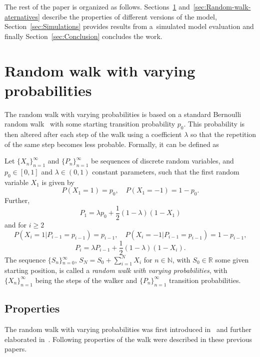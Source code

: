 The rest of the paper is organized as follows.
Sections~\ref{sec:Random-walk-with}
and~\ref{sec:Random-walk-aternatives}
describe the properties of different versions of the model,
Section~\ref{sec:Simulations} provides results from a~simulated
model evaluation and finally Section~\ref{sec:Conclusion} concludes
the work.


\section{Random walk with varying probabilities}\label{sec:Random-walk-with}

The random walk with varying probabilities is based on a standard
Bernoulli random walk~\cite{feller1957introduction} with some starting
transition probability $p_{0}$.
This probability is then altered
after each step of the walk using a coefficient $\lambda$ so that
the repetition of the same step becomes less probable.
Formally, it
can be defined as

\begin{definition}
\label{success_punished}
Let ${\{X_{n}\}}_{n=1}^{\infty}$ and ${\{P_{n}\}}_{n=1}^{\infty}$
be sequences of discrete random variables, and $p_{0}\in[0,1]$
and $\lambda\in(0,1)$ constant parameters, such that the first
random variable $X_{1}$ is given by
\[
P(X_{1}=1)=p_{0},\quad
P(X_{1}=-1)=1-p_{0}.
\]
Further,
\begin{equation}
P_{1}=\lambda p_{0}+\frac{1}{2}(1-\lambda)(1-X_{1})\label{eq:P!1_def}
\end{equation}
and for $i\geq2$
\[
P(X_{i}=1|P_{i-1}=p_{i-1})=p_{i-1},\quad
P(X_{i}=-1|P_{i-1}=p_{i-1})=1-p_{i-1},
\]
\begin{equation}
P_{i}=\lambda P_{i-1}+\frac{1}{2}(1-\lambda)(1-X_{i}).\label{eq:Pi_def}
\end{equation}
The sequence ${\{S_{n}\}}{}_{n=0}^{\infty}$, $S_{N}=S_{0}+\sum_{i=1}^{N}X_{i}$
for $n\in\mathbb{N}$, with $S_{0}\in\mathbb{R}$ some given starting
position, is called a \emph{random walk with varying probabilities},
with ${\{X_{n}\}}_{n=1}^{\infty}$ being the steps of the walker and
${\{P_{n}\}}_{n=1}^{\infty}$ transition probabilities.
\end{definition}

\subsection{Properties}\label{subsec:properties}
The random walk with varying probabilities was first introduced in~\cite{ja2017ddny} and further elaborated in~\cite{ja2019teze}.
Following properties of the walk were described in these previous
papers.

